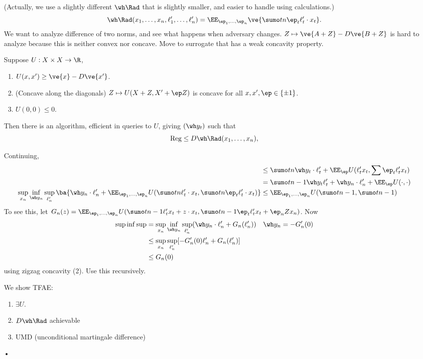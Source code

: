 (Actually, we use a slightly different $\wh\Rad$ that is slightly smaller, and easier to handle using calculations.)
$$
\wh \Rad(x_1,\ldots, x_n, \ell_1',\ldots, \ell_n')
=\EE_{\ep_1,\ldots, \ep_n} \ve{\sumo tn \ep_t\ell_t'\cdot x_t}.
$$
We want to analyze difference of two norms, and see what happens when adversary changes. $Z\mapsto \ve{A+Z}-D\ve{B+Z}$ is hard to analyze because this is neither convex nor concave. Move to surrogate that has a weak concavity property.
\begin{pr}
Suppose $U:X\times X\to \R$, 
\begin{enumerate}
\item $U(x,x') \ge\ve{x}-D\ve{x'}$.
\item (Concave along the diagonals) $Z\mapsto U(X+Z, X'+\ep Z)$ is concave for all $x,x', \ep\in \{\pm 1\}$.
\item $U(0,0)\le 0$.
\end{enumerate}
Then there is an algorithm, efficient in queries to $U$, giving $(\wh y_t)$ such that 
$$
\text{Reg}\le D\wh \Rad(x_1,\ldots, x_n),
$$
\end{pr}
Continuing,
\begin{align}
&\le \sumo tn \wh y_t\cdot \ell_t' + \EE_\ep U(\ell_t'x_t, \sum \ep_t\ell_t'x_t)\\
&= \sumo t{n-1} \wh y_t\ell_t' + \wh y_n \cdot \ell_n' + \EE_\ep U(\cdot, \cdot)\\
\sup_{x_n}\inf_{\wh y_n} \sup_{\ell_n'} 
\ba{
\wh y_n \cdot \ell_n' + \EE_{\ep_1,\ldots, \ep_n} U(\sumo tn \ell_t'\cdot x_t,\sumo tn \ep_t \ell_t'\cdot x_t)
} & \le \EE_{\ep_1,\ldots, \ep_n} U(\sumo t{n-1},\sumo t{n-1})
\end{align}
To see this, let $G_n (z) = \EE_{\ep_1,\ldots, \ep_n} U(\sumo t{n-1} \ell_t'x_t+z\cdot x_t, \sumo t{n-1}\ep_t\ell_t'x_t + \ep_n Zx_n)$. Now 
\begin{align}
\sup\inf\sup &= \sup_{x_n}\inf_{\wh y_n}\sup_{\ell_n'} (\wh y_n \cdot \ell_n' + G_n(\ell_n')) &\wh y_n&=-G_n'(0)\\
&\le \sup_{x_n} \sup_{\ell_n'} [-G_n'(0)\ell_n' + G_n(\ell_n')]\\
&\le G_n(0)
\end{align}
using zigzag concavity (2).
Use this recursively. 

We show TFAE:
\begin{enumerate}
\item
$\exists U$.
\item
$D\wh\Rad$ achievable
\item
UMD (unconditional martingale difference)
\end{enumerate}•

